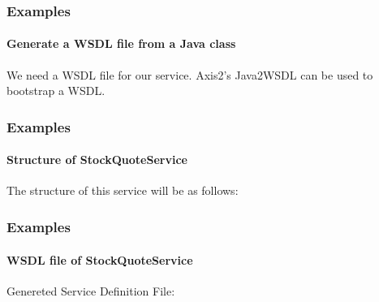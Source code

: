 \documentclass{beamer}
\begin{document}
\begin{frame}
\frametitle{Examples}
\framesubtitle{Generate a WSDL file from a Java class}
We need a WSDL file for our service. Axis2's 
Java2WSDL can be used to bootstrap a WSDL.

\end{frame}


\begin{frame}
\frametitle{Examples}
\framesubtitle{Structure of StockQuoteService}
The structure of this service will be as follows:

\end{frame}

\begin{frame}
\frametitle{Examples}
\framesubtitle{WSDL file of StockQuoteService}
Genereted Service Definition File:

\end{frame}
\end{document}

